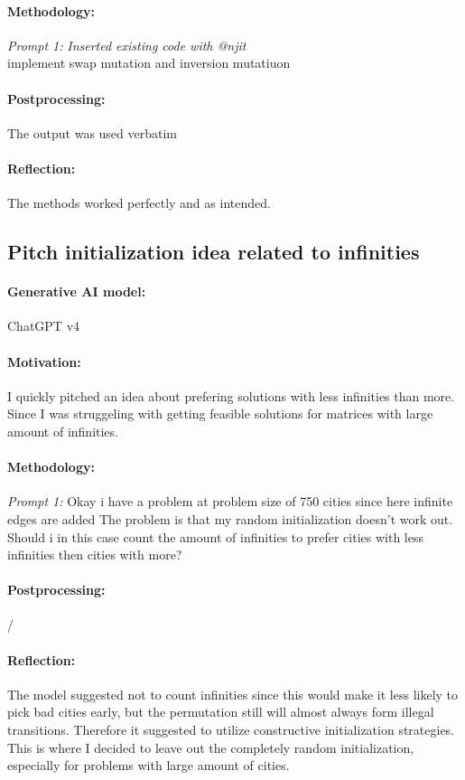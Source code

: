 \documentclass[a4paper,10pt]{article} %
\begin{document}
\paragraph{Methodology:} 
\textit{Prompt 1:}
\textit{Inserted existing code with @njit} \\
implement swap mutation and inversion mutatiuon
\paragraph{Postprocessing:} 
The output was used verbatim
\paragraph{Reflection:} 
The methods worked perfectly and as intended.



\subsection{Pitch initialization idea related to infinities} 
\paragraph{Generative AI model:} ChatGPT v4
\paragraph{Motivation:}
I quickly pitched an idea about prefering solutions with less infinities than more.
Since I was struggeling with getting feasible solutions for matrices with large amount of infinities.
\paragraph{Methodology:} 
\textit{Prompt 1:}
Okay i have a problem at problem size of 750 cities since here infinite edges are added The problem is that my random initialization doesn't work out. Should i in this case count the amount of infinities to prefer cities with less infinities then cities with more?

\paragraph{Postprocessing:} 
/
\paragraph{Reflection:} 
The model suggested not to count infinities since this would make it less likely to pick bad cities early, but the permutation still will almost always form illegal transitions. Therefore it suggested to utilize constructive initialization strategies. This is where I decided to leave out the completely random initialization, especially for problems with large amount of cities.
\end{document}
